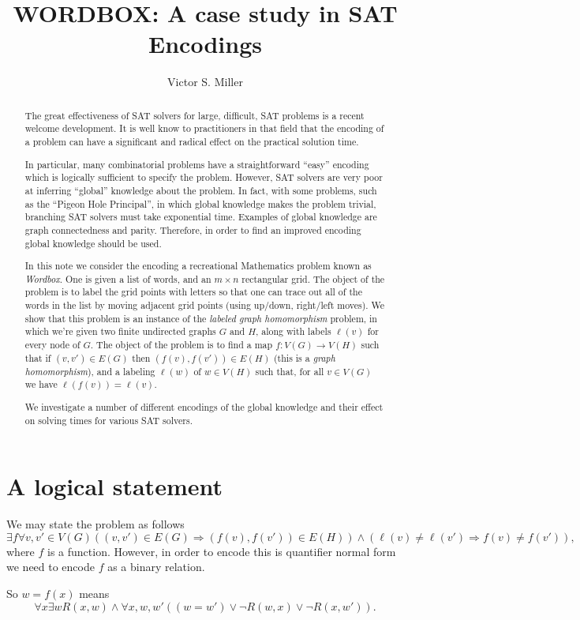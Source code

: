 \documentclass{article}
\title{WORDBOX: A case study in SAT Encodings}
\author{Victor S. Miller}
\affil{IDA Center for Communications Research, Princeton, NJ 08540
USA}
\begin{document}
\maketitle{}
\begin{abstract}
  The great effectiveness of SAT solvers for large, difficult, SAT
  problems is a recent welcome development.  It is well know to
  practitioners in that field that the encoding of a problem can have
  a significant and radical effect on the practical solution time.

  In particular, many combinatorial problems have a straightforward
  ``easy'' encoding which is logically sufficient to specify the
  problem.  However, SAT solvers are very poor at inferring ``global''
  knowledge about the problem.  In fact, with some problems, such as
  the ``Pigeon Hole Principal'', in which global knowledge makes the
  problem trivial, branching SAT solvers must take exponential time.
  Examples of global knowledge are graph connectedness and
  parity. Therefore, in order to find an improved encoding global
  knowledge should be used.

  In this note we consider the encoding a recreational Mathematics
  problem known as \emph{Wordbox}.  One is given a list of words, and
  an $m \times n$ rectangular grid.  The object of the problem is to
  label the grid points with letters so that one can trace out all of
  the words in the list by moving adjacent grid points (using up/down,
  right/left moves).  We show that this problem is an instance of the
  \emph{labeled graph homomorphism} problem, in which we're given two
  finite undirected graphs $G$ and $H$, along with labels $\ell(v)$ for
  every node of $G$.  The object of the problem is to find a map
  $f: V(G) \rightarrow V(H)$ such that if $(v,v') \in E(G)$ then
  $(f(v), f(v')) \in E(H)$ (this is a \emph{graph homomorphism}), and
  a labeling $\ell(w)$ of $w \in V(H)$ such that, for all $v \in V(G)$
  we have $\ell(f(v)) = \ell(v)$.

  We investigate a number of different encodings of the global
  knowledge and their effect on solving times for various SAT solvers.
\end{abstract}

\section{A logical statement}
\label{sec:logical-statement}

We may state the problem as follows
\begin{equation}
  \label{eq:1}
  \exists f \forall v,v' \in V(G) ((v,v') \in E(G) \Rightarrow (f(v),
  f(v')) \in E(H)) \wedge (\ell(v) \ne \ell(v') \Rightarrow f(v) \ne f(v')),
\end{equation}
where $f$ is a function.  However, in order to encode this is
quantifier normal form we need to encode $f$ as a binary relation.

So $w=f(x)$ means
\begin{displaymath}
  \forall x \exists w R(x,w) \wedge \forall x,w,w' ((w = w') \vee
  \neg R(w,x) \vee \neg R(x,w')).
\end{displaymath}
\end{document}
